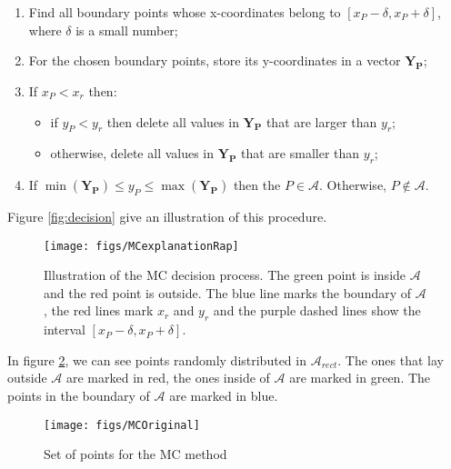 \begin{enumerate}

\item Find all boundary points whose x-coordinates belong to $[x_P-\delta, x_P+\delta]$, where $\delta$ is a small number;

\item For the chosen boundary points, store its y-coordinates in a vector $\mathbf{Y_P}$;

\item If $x_P < x_r$ then:

	\begin{itemize}

	\item if $y_P< y_r$ then delete all values in $\mathbf{Y_P}$ that are larger than $y_r$;

	\item otherwise, delete all values in $\mathbf{Y_P}$ that are smaller than $y_r$;

	\end{itemize}

\item If $\min(\mathbf{Y_P}) \leq y_P \leq \max (\mathbf{Y_P})$ then the $P \in \mathcal{A}$. Otherwise, $P \notin \mathcal{A}$. 

\end{enumerate}

Figure \ref{fig:decision} give an illustration of this procedure.

\begin{figure}[!ht]
  \centering
  \texttt{[image: figs/MCexplanationRap]}
  \caption{Illustration of the MC decision process. The green point is inside $\mathcal{A}$ and the red point is outside. The blue line marks the boundary of $\mathcal{A}$, the red lines mark $x_r$ and $y_r$ and the purple dashed lines show the interval $[x_P-\delta, x_P+\delta]$.  \label{fig:decision}}
 \label{fig:MCexp}
\end{figure}

In figure \ref{fig:MCOriginal}, we can see points randomly distributed in $\mathcal{A}_{rect}$. The ones that lay outside $\mathcal{A}$ are marked in red, the ones inside of $\mathcal{A}$ are marked in green. The points in the boundary of $\mathcal{A}$ are marked in blue.

\begin{figure}[!ht]
  \centering
  \label{fig:mcbound}
  \texttt{[image: figs/MCOriginal]}
  \caption{Set of points for the MC method}
 \label{fig:MCOriginal}
\end{figure}

